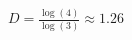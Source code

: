 \documentclass[preview]{standalone}
\begin{document}
\begin{align*}
D = \frac{\log(4)}{\log(3)} \approx 1.26
\end{align*}
\end{document}
